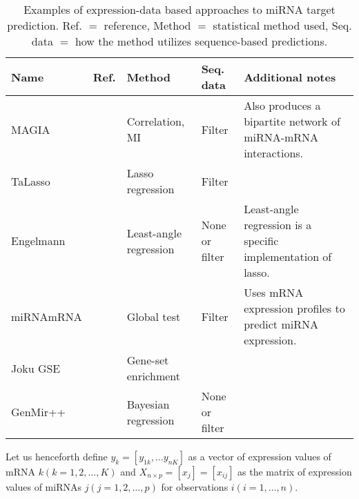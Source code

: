 \begin{table}
  \caption{Examples of expression-data based approaches to miRNA target prediction.
  Ref. $=$ reference, Method $=$ statistical method used, Seq. data $=$ how the method utilizes sequence-based predictions.}
  \label{table:expression-methods}
  \centering
  \begingroup\small
  \begin{tabular}{ llllp{4cm} }
    \\[-1ex] \hline\hline
    \textbf{Name} & \textbf{Ref.} & \textbf{Method} & \textbf{Seq. data} & \textbf{Additional notes} \\
    \hline
    MAGIA     & \citep{Sales2010}      & Correlation, MI        & Filter & Also produces a bipartite network of miRNA-mRNA interactions. \\
    TaLasso   & \citep{Muniategui2013} & Lasso regression       & Filter &  \\
    Engelmann & \citep{Engelmann2012}  & Least-angle regression & None or filter & Least-angle regression is a specific implementation of lasso. \\
    miRNAmRNA & \citep{vanIterson2013} & Global test & Filter   & Uses mRNA expression profiles to predict miRNA expression. \\
    Joku GSE  &                        & Gene-set enrichment    & \\
    GenMir++  & \citep{Huang2007}      & Bayesian regression    & None or filter & \\
    \hline\hline
    \end{tabular}
    \endgroup
\end{table}

Let us henceforth define $y_k = [y_{1k}, \dotsc y_{nK}]$ as a vector of expression
values of mRNA $k (k = 1, 2, \dotsc, K)$ and $X_{n \times p} = [x_j] =
[x_{ij}]$ as the matrix of expression values of miRNAs $j (j = 1, 2, \ldots,
p)$ for observations $i (i = 1, \ldots, n)$.

